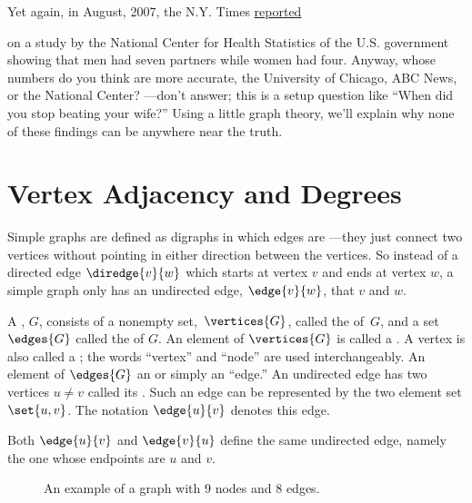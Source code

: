 Yet again, in August, 2007, the N.Y. Times
\href{The-Myth-the-Math-the-Sex.pdf}{reported}
\iffalse
\href{http://www.nytimes.com/2007/08/12/weekinreview/12kolata.html?_r=1&n=Top/Reference/Times%20Topics/People/K/Kolata,%20Gina&oref=slogin}{reported}
\fi
on a study by the National Center for Health Statistics of the U.S. government
showing that men had seven partners while women had four.  Anyway, whose numbers do
you think are more accurate, the University of Chicago, ABC News, or the National
Center? ---don't answer; this is a setup question like ``When did you stop beating
your wife?''  Using a little graph theory, we'll explain why none of these findings
can be anywhere near the truth.

\section{Vertex Adjacency and Degrees}\label{degreessec}

Simple graphs are defined as digraphs in which edges are
 ---they just connect two vertices without pointing
in either direction between the vertices.  So instead of a directed
edge $\diredge{v}{w}$ which starts at vertex $v$ and ends at vertex
$w$, a simple graph only has an undirected edge, $\edge{v}{w}$, that
 $v$ and $w$.

\begin{definition}\label{simplegraphdef}
  A , $G$, consists of a nonempty
  set,~$\vertices{G}$, called the  of~$G$, and a set
  $\edges{G}$ called the  of $G$.  An element of
  $\vertices{G}$ is called a .  A vertex is also called a
  ; the words ``vertex'' and ``node'' are used
  interchangeably.  An element of $\edges{G}$ an  or simply an ``edge.''  An undirected edge has two vertices
  $u\neq v$ called its .  Such an edge can be
  represented by the two element set $\set{u,v}$.  The notation
  $\edge{u}{v}$ denotes this edge.
\end{definition}
Both $\edge{u}{v}$ and $\edge{v}{u}$ define the same undirected edge,
namely the one whose endpoints are $u$ and $v$.

\begin{figure}[h]


\caption{An example of a graph with 9 nodes and 8 edges.}

\label{fig:graph-example}

\end{figure}

